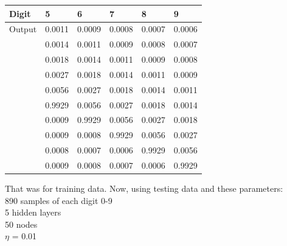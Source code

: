 \documentclass[letterpaper,11pt]{article}
\begin{document}
\begin{table}[H]
\begin{tabular}{l|lllll}
Digit  & 5                             & 6                             & 7                             & 8                             & 9                             \\ \hline
Output & 0.0011                        & 0.0009                        & 0.0008                        & 0.0007                        & 0.0006                        \\
       & 0.0014                        & 0.0011                        & 0.0009                        & 0.0008                        & 0.0007                        \\
       & 0.0018                        & 0.0014                        & 0.0011                        & 0.0009                        & 0.0008                        \\
       & 0.0027                        & 0.0018                        & 0.0014                        & 0.0011                        & 0.0009                        \\
       & 0.0056                        & 0.0027                        & 0.0018                        & 0.0014                        & 0.0011                        \\
       & {\color[HTML]{3531FF} 0.9929} & 0.0056                        & 0.0027                        & 0.0018                        & 0.0014                        \\
       & 0.0009                        & {\color[HTML]{3531FF} 0.9929} & 0.0056                        & 0.0027                        & 0.0018                        \\
       & 0.0009                        & 0.0008                        & {\color[HTML]{3531FF} 0.9929} & 0.0056                        & 0.0027                        \\
       & 0.0008                        & 0.0007                        & 0.0006                        & {\color[HTML]{3531FF} 0.9929} & 0.0056                        \\
       & 0.0009                        & 0.0008                        & 0.0007                        & 0.0006                        & {\color[HTML]{3531FF} 0.9929}
\end{tabular}
\end{table}

That was for training data. Now, using testing data and these parameters:\\

890 samples of each digit 0-9\\
5 hidden layers\\
50 nodes\\
$\eta$ = 0.01\\
\end{document}
